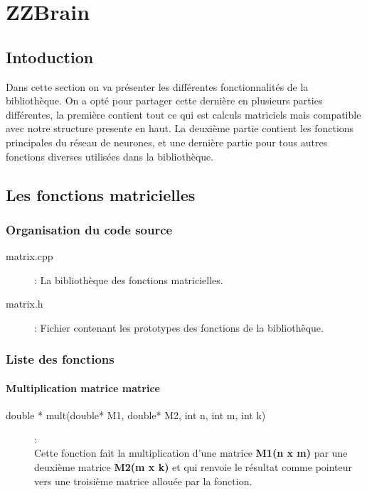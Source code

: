 \section{ZZBrain}

\subsection{Intoduction}
	Dans cette section on va présenter les différentes fonctionnalités de la bibliothèque.
On a opté pour partager cette dernière en plusieurs parties différentes, la première contient tout ce qui est calculs matriciels mais compatible avec notre structure presente en haut.
La deuxième partie contient les fonctions principales du réseau de neurones, et une dernière partie pour tous autres fonctions diverses utilisées dans la bibliothèque.

\subsection{Les fonctions matricielles}

\subsubsection{Organisation du code source}

\begin{description}
\item[matrix.cpp] : La bibliothèque des fonctions matricielles.
\item[matrix.h] : Fichier contenant les prototypes des fonctions de la bibliothèque.
\end{description}
\subsubsection{Liste des fonctions}

\paragraph{Multiplication matrice matrice}
\begin{description}
\item[{double * mult(double* M1, double* M2, int n, int m, int k)}] :\\ Cette fonction fait la multiplication d'une matrice \textbf{M1(n x m)} par une deuxième matrice \textbf{M2(m x k)} et qui renvoie le résultat comme pointeur vers une troisième matrice allouée par la fonction.
\end{description}


